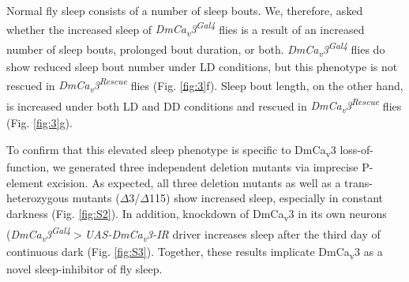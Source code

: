 Normal fly sleep consists of a number of sleep bouts.
We, therefore, asked whether the increased sleep of \emph{DmCa\textsubscript{v}3\textsuperscript{Gal4}} flies is a result of an increased number of sleep bouts, prolonged bout duration, or both.
\emph{DmCa\textsubscript{v}3\textsuperscript{Gal4}} flies do show reduced sleep bout number under LD conditions, but this phenotype is not rescued in \emph{DmCa\textsubscript{v}3\textsuperscript{Rescue}} flies (Fig. \ref{fig:3}f).
Sleep bout length, on the other hand, is increased under both LD and DD conditions and rescued in \emph{DmCa\textsubscript{v}3\textsuperscript{Rescue}} flies (Fig. \ref{fig:3}g).

To confirm that this elevated sleep phenotype is specific to DmCa\textsubscript{v}3 loss-of-function, we generated three independent deletion mutants via imprecise P-element excision.
As expected, all three deletion mutants as well as a trans-heterozygous mutants ($\Delta$3/$\Delta$115) show increased sleep, especially in constant darkness (Fig. \ref{fig:S2}).
In addition, knockdown of DmCa\textsubscript{v}3 in its own neurons (\emph{DmCa\textsubscript{v}3\textsuperscript{Gal4}$>$UAS-DmCa\textsubscript{v}3-IR} driver increases sleep after the third day of continuous dark (Fig. \ref{fig:S3}).
Together, these results implicate DmCa\textsubscript{v}3 as a novel sleep-inhibitor of fly sleep.
